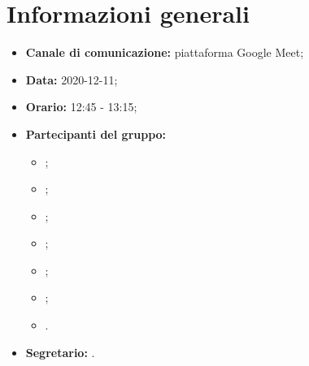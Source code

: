 \section*{Informazioni generali}
\begin{itemize}
\item \textbf{Canale di comunicazione:} piattaforma Google Meet;
\item \textbf{Data:} 2020-12-11;
\item \textbf{Orario:} 12:45 - 13:15;
\item \textbf{Partecipanti del gruppo:}
	\begin{itemize}
	\item \MDI ;
	\item \MB ;
	\item \SB ;
	\item \GB ;
	\item \NM ;
	\item \FD ;
	\item \VAS .
	\end{itemize}
\item \textbf{Segretario:} \GB .

\end{itemize}